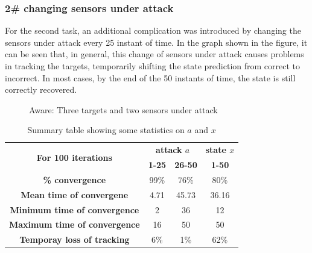     \subsubsection*{2\# changing sensors under attack}
For the second task, an additional complication was introduced by changing the sensors under attack every 25 instant of time. In the graph shown in the figure, it can be seen that, in general, this change of sensors under attack causes problems in tracking the targets, temporarily shifting the state prediction from correct to incorrect. In most cases, by the end of the 50 instants of time, the state is still correctly recovered.
    \begin{figure}[h]
    \centering
    \caption{Aware: Three targets and two sensors under attack}
    \end{figure}
\begin{table}[h!]
\centering
\begin{tabular}{|c|c|c|c|}
\hline
\multirow{2}{*}{\textbf{For 100 iterations}} & \multicolumn{2}{|c|}{\textbf{attack $a$}} & \multicolumn{1}{|c|}{\textbf{state $x$}} \\
\cline{2-4}
 & \textbf{1-25} & \textbf{26-50} & \textbf{1-50} \\
\hline
\textbf{\% convergence} &99\% &76\% &80\% \\
\hline
\textbf{Mean time of convergene} &4.71 &45.73 &36.16 \\
\hline
\textbf{Minimum time of convergence} &2 &36 &12 \\
\hline
\textbf{Maximum time of convergence} &16 &50 &50 \\
\hline
\textbf{Temporay loss of tracking} &6\% &1\% &62\% \\
\hline
\end{tabular}
\caption{Summary table showing some statistics on $a$ and $x$}
\label{table:2}
\end{table}
    
